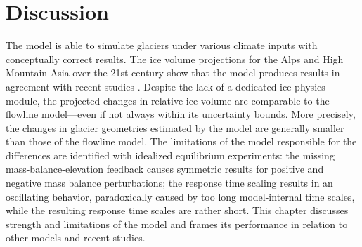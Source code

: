 \chapter{Discussion}\label{chap:discussion}
\thispagestyle{plain}





    The \vas{} model is able to simulate glaciers under various climate inputs with conceptually correct results.
    The ice volume projections for the Alps and High Mountain Asia over the 21st century show that the \vas{} model produces results in agreement with recent studies \citep[e.g.,][]{Marzeion2020}. Despite the lack of a dedicated ice physics module, the projected changes in relative ice volume are comparable to the flowline model---even if not always within its uncertainty bounds. More precisely, the changes in glacier geometries estimated by the \vas{} model are generally smaller than those of the flowline model. The limitations of the \vas{} model responsible for the differences are identified with idealized equilibrium experiments: the missing mass-balance-elevation feedback causes symmetric results for positive and negative mass balance perturbations; the response time scaling results in an oscillating behavior, paradoxically caused by too long model-internal time scales, while the resulting response time scales are rather short. This chapter discusses strength and limitations of the \vas{} model and frames its performance in relation to other models and recent studies.
    
